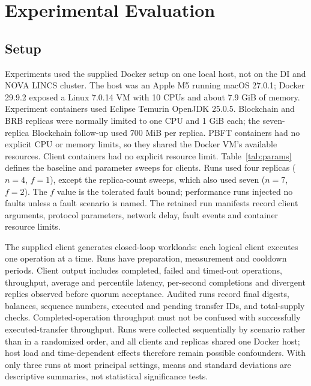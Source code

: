 \documentclass[sigconf,a4paper]{acmart}
\begin{document}
    \section{Experimental Evaluation}
    \label{sec:eval}

    \subsection{Setup}

    Experiments used the supplied Docker setup on one local host, not on the DI
    and NOVA LINCS cluster. The host was an Apple M5 running macOS 27.0.1; Docker
    29.9.2 exposed a Linux 7.0.14 VM with 10 CPUs and about 7.9 GiB of memory.
    Experiment containers used Eclipse Temurin OpenJDK 25.0.5. Blockchain and
    BRB replicas were normally limited to one CPU and 1 GiB each; the seven-
    replica Blockchain follow-up used 700 MiB per replica. PBFT containers had
    no explicit CPU or memory limits, so they shared the Docker VM's available
    resources. Client containers had
    no explicit resource limit. Table~\ref{tab:params} defines the baseline and parameter sweeps
    for clients. Runs used four replicas ($n=4$, $f=1$), except
    the replica-count sweeps, which also used seven ($n=7$, $f=2$). The $f$
    value is the tolerated fault bound; performance runs injected no faults
    unless a fault scenario is named. The retained run manifests record client
    arguments, protocol parameters, network delay,
    fault events and container resource limits.

    The supplied client generates closed-loop workloads: each logical client
    executes one operation at a time. Runs have preparation, measurement and
    cooldown periods. Client output includes completed, failed and timed-out
    operations, throughput, average and percentile latency, per-second
    completions and divergent replies observed before quorum acceptance.
    Audited runs record final digests, balances, sequence numbers, executed and
    pending transfer IDs, and total-supply checks. Completed-operation
    throughput must not be confused with successfully executed-transfer
    throughput. Runs were collected sequentially by scenario rather than in a
    randomized order, and all clients and replicas shared one Docker host;
    host load and time-dependent effects therefore remain possible confounders.
    With only three runs at most principal settings, means and standard deviations
    are descriptive summaries, not statistical significance tests.
\end{document}
